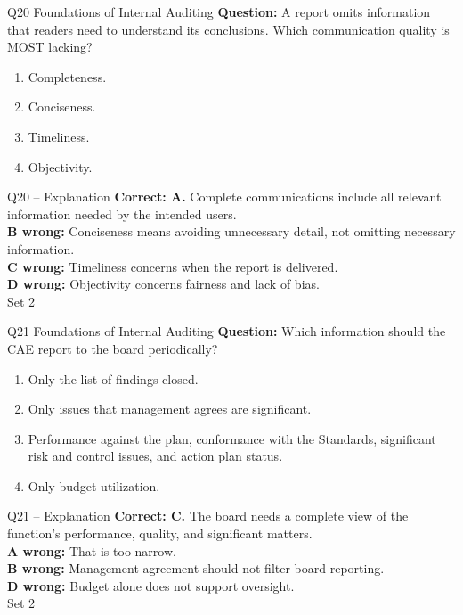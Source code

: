 \documentclass[aspectratio=169,10pt]{beamer}
\begin{document}
\begin{frame}[t]{Q20 \hfill {\scriptsize Foundations of Internal Auditing}}
	\small
	\textbf{Question:} A report omits information that readers need to understand its conclusions. Which communication quality is MOST lacking?
	\begin{enumerate}[label=\Alph*.,itemsep=1pt,topsep=3pt]
			\item Completeness.
			\item Conciseness.
			\item Timeliness.
			\item Objectivity.
	\end{enumerate}
\end{frame}

\begin{frame}[t]{Q20 -- Explanation}
	\footnotesize
	\textbf{Correct: A.} Complete communications include all relevant information needed by the intended users. \\[5pt]
\textbf{B wrong:} Conciseness means avoiding unnecessary detail, not omitting necessary information. \\[3pt]
\textbf{C wrong:} Timeliness concerns when the report is delivered. \\[3pt]
\textbf{D wrong:} Objectivity concerns fairness and lack of bias. \\[3pt]
	\vfill {\tiny Set 2}
\end{frame}

\begin{frame}[t]{Q21 \hfill {\scriptsize Foundations of Internal Auditing}}
	\small
	\textbf{Question:} Which information should the CAE report to the board periodically?
	\begin{enumerate}[label=\Alph*.,itemsep=1pt,topsep=3pt]
			\item Only the list of findings closed.
			\item Only issues that management agrees are significant.
			\item Performance against the plan, conformance with the Standards, significant risk and control issues, and action plan status.
			\item Only budget utilization.
	\end{enumerate}
\end{frame}

\begin{frame}[t]{Q21 -- Explanation}
	\footnotesize
	\textbf{Correct: C.} The board needs a complete view of the function's performance, quality, and significant matters. \\[5pt]
\textbf{A wrong:} That is too narrow. \\[3pt]
\textbf{B wrong:} Management agreement should not filter board reporting. \\[3pt]
\textbf{D wrong:} Budget alone does not support oversight. \\[3pt]
	\vfill {\tiny Set 2}
\end{frame}
\end{document}
